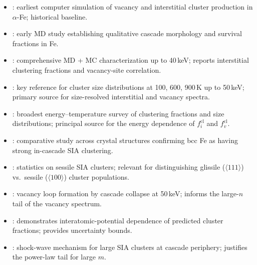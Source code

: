 \documentclass[pdflatex,sn-basic]{sn-jnl} %
\begin{document}
\begin{itemize}
\item \cite{Beeler1966VacancyInterstitialClusters}: earliest computer
  simulation of vacancy and interstitial cluster production in
  $\alpha$-Fe; historical baseline.

\item \cite{Calder1993FeCascades}: early MD study establishing
  qualitative cascade morphology and survival fractions in Fe.

\item \cite{Stoller1997PrimaryDamageBCCFe}: comprehensive MD + MC
  characterization up to 40\,keV; reports interstitial clustering
  fractions and vacancy-site correlation.

\item \cite{Stoller1998PointDefectClusterFormation}: key reference
  for cluster size distributions at 100, 600, 900\,K up to 50\,keV;
  primary source for size-resolved interstitial and vacancy spectra.

\item \cite{Stoller2000RoleCascadeEnergyTemperature}: broadest
  energy--temperature survey of clustering fractions and size
  distributions; principal source for the energy dependence of
  $f_i^{\mathrm{cl}}$ and $f_v^{\mathrm{cl}}$.

\item \cite{Bacon2000PrimaryDamageState}: comparative study across
  crystal structures confirming bcc Fe as having strong in-cascade
  SIA clustering.

\item \cite{Gao2000LargeInterstitialClusters}: statistics on
  sessile SIA clusters; relevant for distinguishing glissile
  ($\langle 111\rangle$) vs.\ sessile ($\langle 100\rangle$)
  cluster populations.

\item \cite{Soneda2001VacancyLoopCascadeCollapse}: vacancy loop
  formation by cascade collapse at 50\,keV; informs the large-$n$
  tail of the vacancy spectrum.

\item \cite{Terentyev2006PotentialEffectFe}: demonstrates
  interatomic-potential dependence of predicted cluster fractions;
  provides uncertainty bounds.

\item \cite{Calder2010LargeInterstitialOrigin}: shock-wave
  mechanism for large SIA clusters at cascade periphery; justifies
  the power-law tail for large $m$.


\end{itemize}
\end{document}

